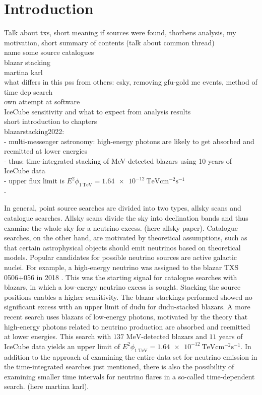 \chapter{Introduction}
Talk about txs, short meaning if sources were found, thorbens analysis, my motivation, short summary of contents (talk about common thread)\\

name some source catalogues\\
blazar stacking\\
martina karl\\
what differs in this pss from others: csky, removing gfu-gold mc events, method of time dep search\\
own attempt at software\\
IceCube sensitivity and what to expect from analysis results\\
short introduction to chapters\\

blazarstacking2022:\\
- multi-messenger astronomy: high-energy photons are likely to get absorbed and reemitted at lower energies\\
- thus: time-integrated stacking of MeV-detected blazars using 10 years of IceCube data\\
- upper flux limit is $E^2\phi_{\SI{1}{\tera\electronvolt}}=\SI{1.64e-12}{\tera\electronvolt\centi\meter\tothe{-2}\second\tothe{-1}}$\\
- \cite{blazar_stacking_2020}

In general, point source searches are divided into two types, allsky scans and catalogue searches.
Allsky scans divide the sky into declination bands and thus examine the whole sky for a neutrino excess.
(here allsky paper).
Catalogue searches, on the other hand, are motivated by theoretical assumptions, such as that certain astrophysical objects should emit neutrinos based on theoretical models.
Popular candidates for possible neutrino sources are active galactic nuclei.
For example, a high-energy neutrino was assigned to the blazar TXS 0506+056 in 2018 \cite{txs}.
This was the starting signal for catalogue searches with blazars, in which a low-energy neutrino excess is sought.
Stacking the source positions enables a higher sensitivity.
The blazar stackings performed showed no significant excess with an upper limit of dudu for dudu-stacked blazars.
A more recent search \cite{blazar_stacking_2020} uses blazars of low-energy photons, motivated by the theory that high-energy photons related to neutrino production are absorbed and reemitted at lower energies.
This search with $\num{137}$ $\si{\mega\electronvolt}$-detected blazars and $\num{11}$ years of IceCube data yields an upper limit of $E^2\phi_{\SI{1}{\tera\electronvolt}}=\SI{1.64e-12}{\tera\electronvolt\centi\meter\tothe{-2}\second\tothe{-1}}$.
In addition to the approach of examining the entire data set for neutrino emission in the time-integrated searches just mentioned, there is also the possibility of examining smaller time intervals for neutrino flares in a so-called time-dependent search.
(here martina karl).

